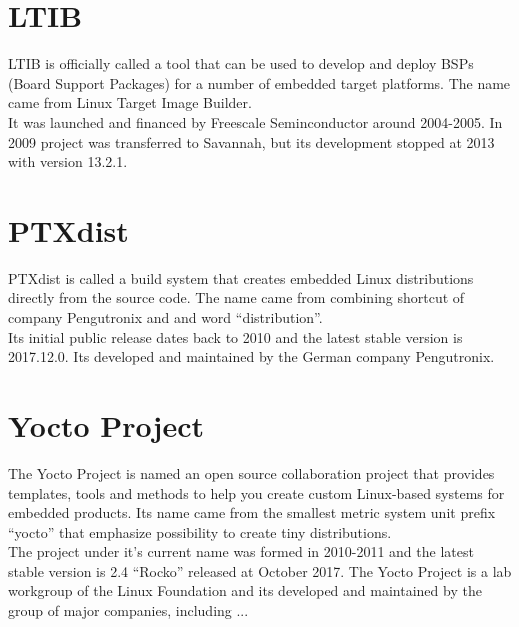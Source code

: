 \documentclass[printmode]{mgr}
\begin{document}
\section{LTIB}


LTIB is officially called a tool that can be used to develop and deploy BSPs (Board Support Packages) for a number of embedded target platforms. The name came from Linux Target Image Builder.
\\
It was launched and financed by Freescale Seminconductor around 2004-2005. In 2009 project was transferred to Savannah, but its development stopped at 2013 with version 13.2.1.

\section{PTXdist}




PTXdist is called a build system that creates embedded Linux distributions directly from the source code. The name came from combining shortcut of company Pengutronix and and word ``distribution''.
\\
Its initial public release dates back to 2010 and the latest stable version is 2017.12.0. Its developed and maintained by the German company Pengutronix.

\section{Yocto Project}

The Yocto Project is named an open source collaboration project that provides templates, tools and methods to help you create custom Linux-based systems for embedded products. Its name came from the smallest metric system unit prefix ``yocto'' that emphasize possibility to create tiny distributions.
\\
The project under it's current name was formed in 2010-2011 and the latest stable version is 2.4 ``Rocko'' released at October 2017. The Yocto Project is a lab workgroup of the Linux Foundation and its developed and maintained by the group of major companies, including ...
\end{document}
